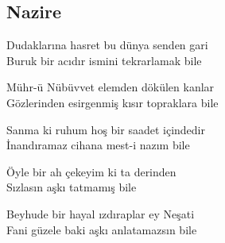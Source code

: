 \subsection{Nazire}

Dudaklarına hasret bu dünya senden gari \\
Buruk bir acıdır ismini tekrarlamak bile

\noindent\newline
Mühr-ü Nübüvvet elemden dökülen kanlar \\
Gözlerinden esirgenmiş kısır topraklara bile

\noindent\newline
Sanma ki ruhum hoş bir saadet içindedir \\
İnandıramaz cihana mest-i nazım bile

\noindent\newline
Öyle bir ah çekeyim ki ta derinden \\
Sızlasın aşkı tatmamış bile

\noindent\newline
Beyhude bir hayal ızdıraplar ey Neşati \\
Fani güzele baki aşkı anlatamazsın bile